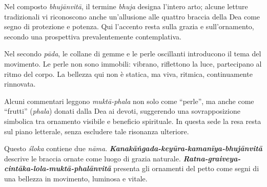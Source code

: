 Nel composto \textit{bhujānvitā}, il termine \textit{bhuja} designa l’intero arto; alcune letture tradizionali vi riconoscono anche un’allusione alle quattro braccia della Dea come segno di protezione e potenza. Qui l’accento resta sulla grazia e sull’ornamento, secondo una prospettiva prevalentemente contemplativa.

Nel secondo \textit{pāda}, le collane di gemme e le perle oscillanti introducono il tema del movimento. Le perle non sono immobili: vibrano, riflettono la luce, partecipano al ritmo del corpo. La bellezza qui non è statica, ma viva, ritmica, continuamente rinnovata.

Alcuni commentari leggono \textit{muktā-phala} non solo come “perle”, ma anche come “frutti” (\textit{phala}) donati dalla Dea ai devoti, suggerendo una sovrapposizione simbolica tra ornamento visibile e beneficio spirituale. In questa sede la resa resta sul piano letterale, senza escludere tale risonanza ulteriore.

Questo \textit{śloka} contiene due \textit{nāma}.  
\textbf{\textit{Kanakāṅgada-keyūra-kamanīya-bhujānvitā}} descrive le braccia ornate come luogo di grazia naturale.  
\textbf{\textit{Ratna-graiveya-cintāka-lola-muktā-phalānvitā}} presenta gli ornamenti del petto come segni di una bellezza in movimento, luminosa e vitale.
